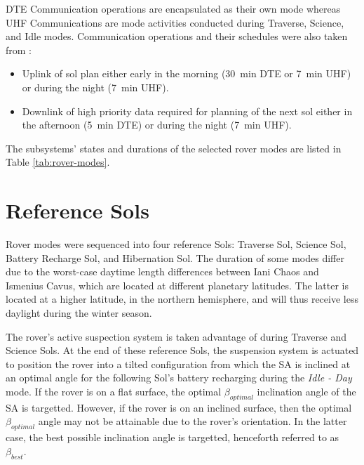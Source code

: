 \ac{DTE} Communication operations are encapsulated as their own mode whereas \ac{UHF} Communications are mode activities conducted during Traverse, Science, and Idle modes. Communication operations and their schedules were also taken from :
\begin{itemize}
    \item Uplink of sol plan either early in the morning (\SI{30}{\minute} \ac{DTE} or \SI{7}{\minute} \ac{UHF}) or during the night (\SI{7}{\minute} \ac{UHF}).
    \item Downlink of high priority data required for planning of the next sol either in the afternoon (\SI{5}{\minute} \ac{DTE}) or during the night (\SI{7}{\minute} \ac{UHF}).
\end{itemize}

The subsystems' states and durations of the selected rover modes are listed in Table \ref{tab:rover-modes}. %



\section{Reference Sols}
\label{sec:ReferenceSols:ReferenceSols}
Rover modes were sequenced into four reference Sols: Traverse Sol, Science Sol, Battery Recharge Sol, and Hibernation Sol. The duration of some modes differ due to the worst-case daytime length differences between Iani Chaos and Ismenius Cavus, which are located at different planetary latitudes. The latter is located at a higher latitude, in the northern hemisphere, and will thus receive less daylight during the winter season.

The rover's active suspection system is taken advantage of during Traverse and Science Sols. At the end of these reference Sols, the suspension system is actuated to position the rover into a tilted configuration from which the \ac{SA} is inclined at an optimal angle for the following Sol's battery recharging during the \textit{Idle - Day} mode. If the rover is on a flat surface, the optimal $\beta_{optimal}$ inclination angle of the \ac{SA} is targetted. However, if the rover is on an inclined surface, then the optimal $\beta_{optimal}$ angle may not be attainable due to the rover's orientation. In the latter case, the best possible inclination angle is targetted, henceforth referred to as $\beta_{best}$.

